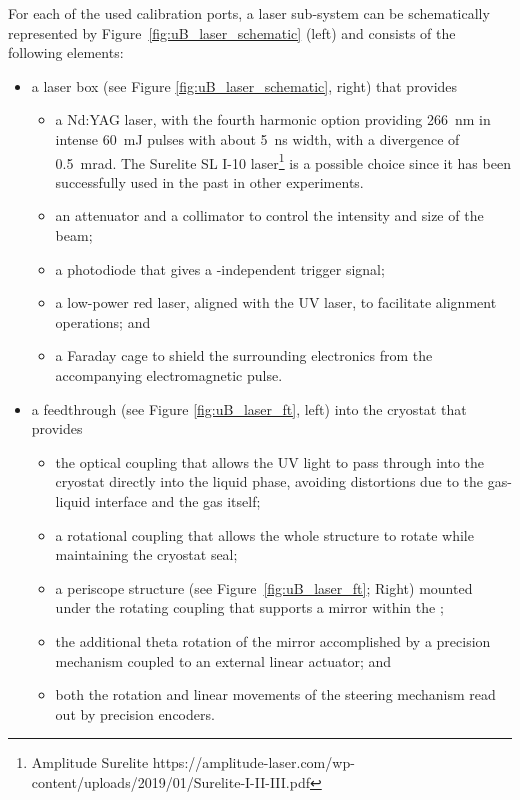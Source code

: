 For each of %
the used calibration ports, a laser sub-system can be schematically represented by Figure~\ref{fig:uB_laser_schematic} (left) and consists of the following elements:
\begin{itemize}
    \item a laser box (see Figure \ref{fig:uB_laser_schematic}, right) that provides
    \begin{itemize}
        \item a Nd:YAG laser, with the fourth harmonic option providing \SI{266}{\nano\m} in intense \SI{60}{\milli\joule} pulses with about \SI{5}{\nano\s} width, with a divergence of \SI{0.5}{\milli\radian}. The Surelite SL I-10 laser\footnote{Amplitude Surelite\texttrademark{} https://amplitude-laser.com/wp-content/uploads/2019/01/Surelite-I-II-III.pdf} is a possible choice since it has been successfully used in the past in other experiments.
        \item an attenuator and a collimator to control the intensity and size of the beam;
        \item a photodiode that gives a -independent trigger signal;
        \item a low-power red laser, aligned with the UV laser, to facilitate alignment operations; and
        \item a Faraday cage to shield the surrounding electronics from the accompanying electromagnetic pulse. %
    \end{itemize}
    \item a feedthrough (see Figure \ref{fig:uB_laser_ft}, left) into the cryostat that provides
    \begin{itemize}
        \item the optical coupling that allows the UV light to pass through into the cryostat directly into the liquid phase, avoiding distortions due to the gas-liquid interface and the gas itself;
        \item a rotational coupling that allows the whole structure to rotate while maintaining the cryostat seal;
        \item a periscope structure (see Figure~\ref{fig:uB_laser_ft}; Right) mounted under the rotating coupling that supports a mirror within the ;
        \item the additional theta rotation of the mirror accomplished by a precision mechanism coupled to an external linear actuator; and
        \item both the rotation and linear movements of the steering mechanism read out by precision encoders.
    \end{itemize}
    
\end{itemize}

